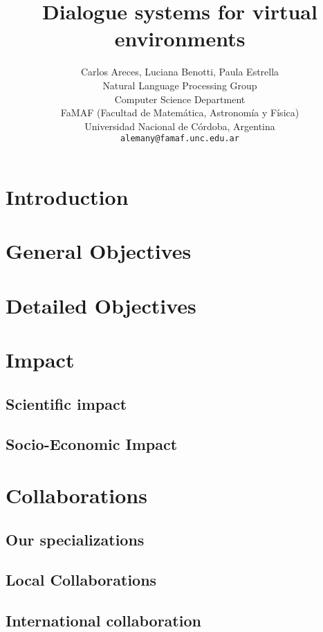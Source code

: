 \documentclass[11pt,letterpaper]{article}
\title{Dialogue systems for virtual environments}
\author{Carlos Areces, Luciana Benotti, Paula Estrella \\
 Natural Language Processing Group \\
Computer Science Department \\
FaMAF (Facultad de Matem\'atica, Astronom\'ia y F\'isica) \\
Universidad Nacional de C\'ordoba, Argentina \\
  {\tt alemany@famaf.unc.edu.ar}
}
\date{}
\begin{document}
\maketitle
\begin{abstract}
\end{abstract}

\section{Introduction}




\section{General Objectives}



\section{Detailed Objectives}




\section{Impact}

\subsection{Scientific impact}



\subsection{Socio-Economic Impact}



\section{Collaborations}

\subsection{Our specializations}



\subsection{Local Collaborations}



\subsection{International collaboration}





\end{document}
